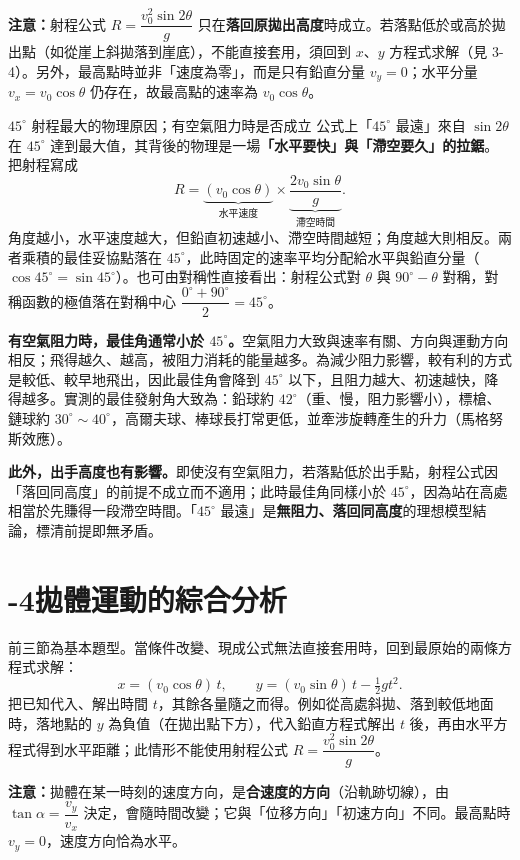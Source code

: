 \documentclass[11pt]{article}
\begin{document}
\textbf{注意：}射程公式 $R=\dfrac{v_0^2\sin 2\theta}{g}$ 只在\textbf{落回原拋出高度}時成立。若落點低於或高於拋出點（如從崖上斜拋落到崖底），不能直接套用，須回到 $x$、$y$ 方程式求解（見 3-4）。另外，最高點時並非「速度為零」，而是只有鉛直分量 $v_y=0$；水平分量 $v_x=v_0\cos\theta$ 仍存在，故最高點的速率為 $v_0\cos\theta$。

\begin{延伸框}{$45^\circ$ 射程最大的物理原因；有空氣阻力時是否成立}
公式上「$45^\circ$ 最遠」來自 $\sin 2\theta$ 在 $45^\circ$ 達到最大值，其背後的物理是一場\textbf{「水平要快」與「滯空要久」的拉鋸}。把射程寫成
$$R=\underbrace{(v_0\cos\theta)}_{\text{水平速度}}\times\underbrace{\frac{2v_0\sin\theta}{g}}_{\text{滯空時間}}.$$
角度越小，水平速度越大，但鉛直初速越小、滯空時間越短；角度越大則相反。兩者乘積的最佳妥協點落在 $45^\circ$，此時固定的速率平均分配給水平與鉛直分量（$\cos45^\circ=\sin45^\circ$）。也可由對稱性直接看出：射程公式對 $\theta$ 與 $90^\circ-\theta$ 對稱，對稱函數的極值落在對稱中心 $\dfrac{0^\circ+90^\circ}{2}=45^\circ$。

\textbf{有空氣阻力時，最佳角通常小於 $45^\circ$。}空氣阻力大致與速率有關、方向與運動方向相反；飛得越久、越高，被阻力消耗的能量越多。為減少阻力影響，較有利的方式是較低、較早地飛出，因此最佳角會降到 $45^\circ$ 以下，且阻力越大、初速越快，降得越多。實測的最佳發射角大致為：鉛球約 $42^\circ$（重、慢，阻力影響小），標槍、鏈球約 $30^\circ\!\sim\!40^\circ$，高爾夫球、棒球長打常更低，並牽涉旋轉產生的升力（馬格努斯效應）。

\textbf{此外，出手高度也有影響。}即使沒有空氣阻力，若落點低於出手點，射程公式因「落回同高度」的前提不成立而不適用；此時最佳角同樣小於 $45^\circ$，因為站在高處相當於先賺得一段滯空時間。「$45^\circ$ 最遠」是\textbf{無阻力、落回同高度}的理想模型結論，標清前提即無矛盾。
\end{延伸框}

\section*{-4\quad 拋體運動的綜合分析}

前三節為基本題型。當條件改變、現成公式無法直接套用時，回到最原始的兩條方程式求解：
$$x=(v_0\cos\theta)\,t,\qquad y=(v_0\sin\theta)\,t-\tfrac12 g t^2.$$
把已知代入、解出時間 $t$，其餘各量隨之而得。例如從高處斜拋、落到較低地面時，落地點的 $y$ 為負值（在拋出點下方），代入鉛直方程式解出 $t$ 後，再由水平方程式得到水平距離；此情形不能使用射程公式 $R=\dfrac{v_0^2\sin2\theta}{g}$。

\textbf{注意：}拋體在某一時刻的速度方向，是\textbf{合速度的方向}（沿軌跡切線），由 $\tan\alpha=\dfrac{v_y}{v_x}$ 決定，會隨時間改變；它與「位移方向」「初速方向」不同。最高點時 $v_y=0$，速度方向恰為水平。
\end{document}
